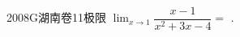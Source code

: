
\begin{problem}{2008}{G}{湖南卷}{11}{极限}
$\displaystyle\lim_{x\to 1}\dfrac{x-1}{x^2+3x-4}=$ \underline{\hspace{4em}}.
\end{problem}

\begin{answer}

\end{answer}

\begin{solutions}

\end{solutions}